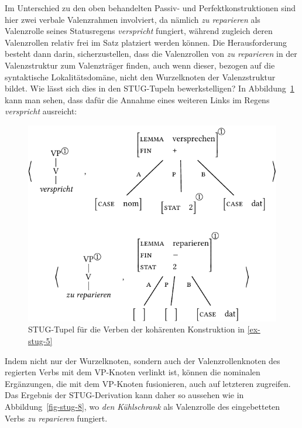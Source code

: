 Im Unterschied zu den oben behandelten Passiv- und Perfektkonstruktionen sind hier zwei verbale Valenzrahmen involviert, da nämlich {\it zu reparieren} als Valenzrolle seines Statusregens {\it verspricht} fungiert, während zugleich deren Valenzrollen relativ frei im Satz platziert werden können. Die Herausforderung besteht dann darin, sicherzustellen, dass die Valenzrollen von {\it zu reparieren} in der Valenzstruktur zum Valenzträger finden, auch wenn dieser, bezogen auf die syntaktische Lokalitätsdomäne, nicht den Wurzelknoten der Valenzstruktur bildet. Wie lässt sich dies in den STUG-Tupeln bewerkstelligen? In Abbildung~\ref{fig-stug-7} kann man sehen, dass dafür die Annahme eines weiteren Links im Regens {\it verspricht} ausreicht:
\begin{figure}[t]
\centering
\includegraphics{graphics/abb97.pdf}
\caption{\label{fig-stug-7}STUG-Tupel für die Verben der kohärenten Konstruktion in \ref{ex-stug-5}}
\end{figure}
Indem nicht nur der Wurzelknoten, sondern auch der Valenzrollenknoten des regierten Verbs mit dem VP-Knoten verlinkt ist, können die nominalen Ergänzungen, die mit dem VP-Knoten fusionieren, auch auf letzteren zugreifen.  
Das Ergebnis der STUG-Derivation kann daher so aussehen wie in Abbildung~\ref{fig-stug-8}, wo {\it den Kühlschrank} als Valenzrolle des eingebetteten Verbs {\it zu reparieren} fungiert.
